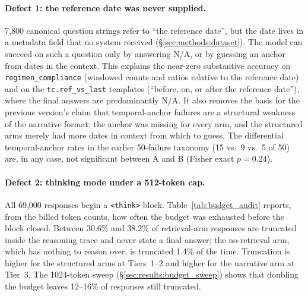 \paragraph{Defect 1: the reference date was never supplied.}
7,800 canonical question strings refer to ``the reference date'', but the date lives in a
metadata field that no system received (\S\ref{sec:methods:dataset}).  The model can
succeed on such a question only by answering N/A, or by guessing an anchor from dates in
the context.  This explains the near-zero substantive accuracy on
\texttt{regimen\_compliance} (windowed counts and ratios relative to the reference date)
and on the \texttt{tc.ref\_vs\_last} templates (``before, on, or after the reference
date''), where the final answers are predominantly N/A.  It also removes the basis for the
previous version's claim that temporal-anchor failures are a structural weakness of the
narrative format: the anchor was missing for every arm, and the structured arms merely had
more dates in context from which to guess.  The differential temporal-anchor rates in the
earlier 50-failure taxonomy (15 vs.\ 9 vs.\ 5 of 50) are, in any case, not significant
between A and B (Fisher exact $p=0.24$).

\paragraph{Defect 2: thinking mode under a 512-token cap.}
All 69,000 responses begin a \texttt{<think>} block.  Table~\ref{tab:budget_audit}
reports, from the billed token counts, how often the budget was exhausted before the
block closed.  Between 30.6\% and 38.2\% of retrieval-arm responses are truncated inside
the reasoning trace and never state a final answer; the no-retrieval arm, which has
nothing to reason over, is truncated 1.4\% of the time.  Truncation is higher for the
structured arms at Tiers~1--2 and higher for the narrative arm at Tier~3.  The
1024-token sweep (\S\ref{sec:results:budget_sweep}) shows that doubling the budget leaves
12--16\% of responses still truncated.

